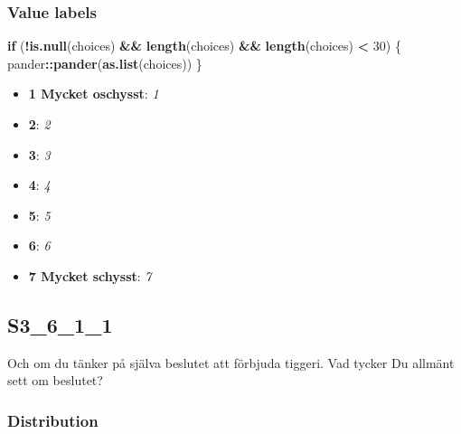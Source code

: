 \documentclass[]{book}
\newenvironment{Shaded}{\begin{snugshade}}{\end{snugshade}}
\newcommand{\KeywordTok}[1]{\textcolor[rgb]{0.13,0.29,0.53}{\textbf{#1}}}
\newcommand{\DecValTok}[1]{\textcolor[rgb]{0.00,0.00,0.81}{#1}}
\newcommand{\StringTok}[1]{\textcolor[rgb]{0.31,0.60,0.02}{#1}}
\newcommand{\ControlFlowTok}[1]{\textcolor[rgb]{0.13,0.29,0.53}{\textbf{#1}}}
\newcommand{\OperatorTok}[1]{\textcolor[rgb]{0.81,0.36,0.00}{\textbf{#1}}}
\newcommand{\NormalTok}[1]{#1}
\providecommand{\tightlist}{%
  \setlength{\itemsep}{0pt}\setlength{\parskip}{0pt}}
\begin{document}
\subsubsection{Value labels}\label{S3_5_1_labels}

\begin{Shaded}
\begin{Highlighting}[]
\ControlFlowTok{if}\NormalTok{ (}\OperatorTok{!}\KeywordTok{is.null}\NormalTok{(choices) }\OperatorTok{&&}\StringTok{ }\KeywordTok{length}\NormalTok{(choices) }\OperatorTok{&&}\StringTok{ }\KeywordTok{length}\NormalTok{(choices) }\OperatorTok{<}\StringTok{ }\DecValTok{30}\NormalTok{) \{}
\NormalTok{    pander}\OperatorTok{::}\KeywordTok{pander}\NormalTok{(}\KeywordTok{as.list}\NormalTok{(choices))}
\NormalTok{\}}
\end{Highlighting}
\end{Shaded}

\begin{itemize}
\tightlist
\item
  \textbf{1 Mycket oschysst}: \emph{1}
\item
  \textbf{2}: \emph{2}
\item
  \textbf{3}: \emph{3}
\item
  \textbf{4}: \emph{4}
\item
  \textbf{5}: \emph{5}
\item
  \textbf{6}: \emph{6}
\item
  \textbf{7 Mycket schysst}: \emph{7}
\end{itemize}

\subsection{S3\_6\_1\_1}\label{S3_6_1_1}

Och om du tänker på själva beslutet att förbjuda tiggeri. Vad tycker Du
allmänt sett om beslutet?

\subsubsection{Distribution}\label{S3_6_1_1_distribution}
\end{document}
